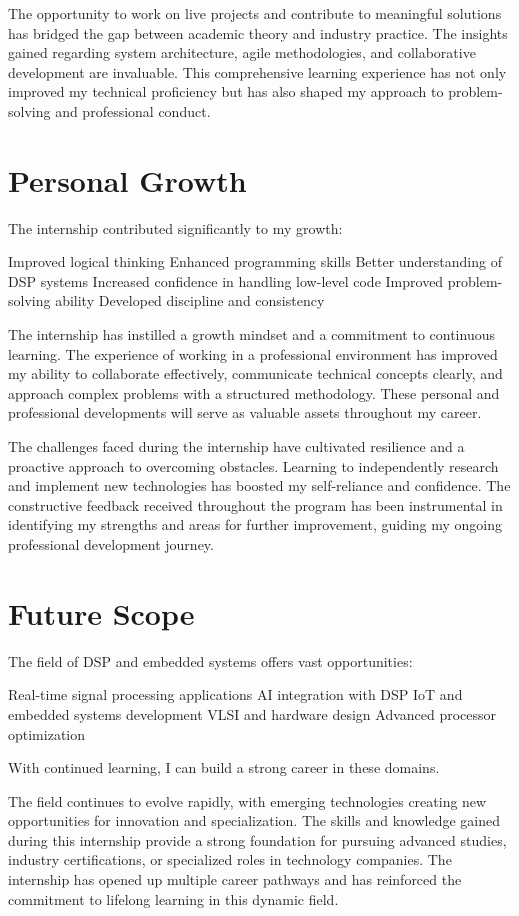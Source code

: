 \documentclass[12pt,a4paper]{report}
\begin{document}
The opportunity to work on live projects and contribute to meaningful solutions has bridged the gap between academic theory and industry practice. The insights gained regarding system architecture, agile methodologies, and collaborative development are invaluable. This comprehensive learning experience has not only improved my technical proficiency but has also shaped my approach to problem-solving and professional conduct.


\section{Personal Growth}

The internship contributed significantly to my growth:


Improved logical thinking Enhanced programming skills Better understanding of DSP systems Increased confidence in handling low-level code Improved problem-solving ability Developed discipline and consistency


The internship has instilled a growth mindset and a commitment to continuous learning. The experience of working in a professional environment has improved my ability to collaborate effectively, communicate technical concepts clearly, and approach complex problems with a structured methodology. These personal and professional developments will serve as valuable assets throughout my career.


The challenges faced during the internship have cultivated resilience and a proactive approach to overcoming obstacles. Learning to independently research and implement new technologies has boosted my self-reliance and confidence. The constructive feedback received throughout the program has been instrumental in identifying my strengths and areas for further improvement, guiding my ongoing professional development journey.


\section{Future Scope}

The field of DSP and embedded systems offers vast opportunities:


Real-time signal processing applications AI integration with DSP IoT and embedded systems development VLSI and hardware design Advanced processor optimization


With continued learning, I can build a strong career in these domains.


The field continues to evolve rapidly, with emerging technologies creating new opportunities for innovation and specialization. The skills and knowledge gained during this internship provide a strong foundation for pursuing advanced studies, industry certifications, or specialized roles in technology companies. The internship has opened up multiple career pathways and has reinforced the commitment to lifelong learning in this dynamic field.
\end{document}
